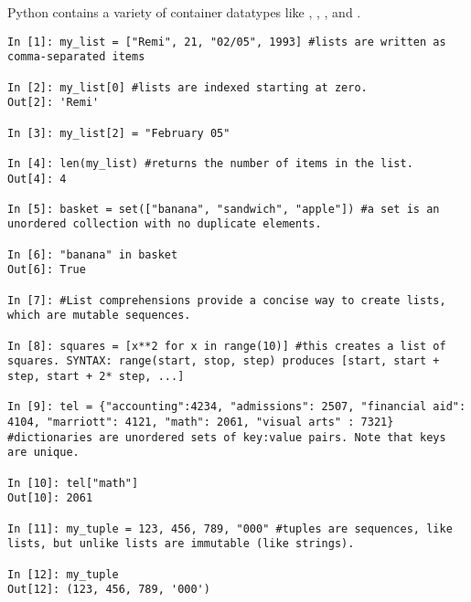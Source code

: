 \begin{example}
Python contains a variety of container datatypes like , , 
, and .

\begin{lstlisting}
In [1]: my_list = ["Remi", 21, "02/05", 1993] #lists are written as comma-separated items 

In [2]: my_list[0] #lists are indexed starting at zero.
Out[2]: 'Remi'

In [3]: my_list[2] = "February 05"

In [4]: len(my_list) #returns the number of items in the list.
Out[4]: 4

In [5]: basket = set(["banana", "sandwich", "apple"]) #a set is an unordered collection with no duplicate elements. 

In [6]: "banana" in basket
Out[6]: True

In [7]: #List comprehensions provide a concise way to create lists, which are mutable sequences. 

In [8]: squares = [x**2 for x in range(10)] #this creates a list of squares. SYNTAX: range(start, stop, step) produces [start, start + step, start + 2* step, ...]

In [9]: tel = {"accounting":4234, "admissions": 2507, "financial aid": 4104, "marriott": 4121, "math": 2061, "visual arts" : 7321} #dictionaries are unordered sets of key:value pairs. Note that keys are unique.

In [10]: tel["math"]
Out[10]: 2061

In [11]: my_tuple = 123, 456, 789, "000" #tuples are sequences, like lists, but unlike lists are immutable (like strings). 

In [12]: my_tuple
Out[12]: (123, 456, 789, '000')



\end{lstlisting}
\end{example}

